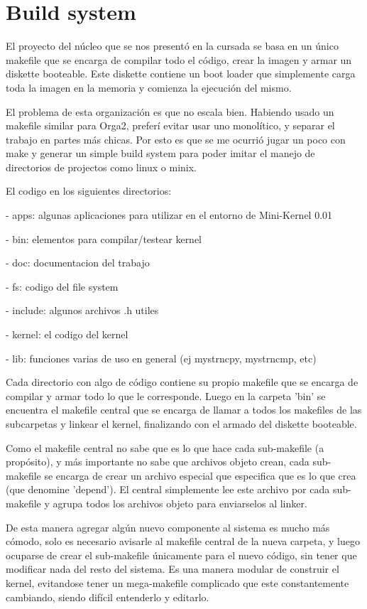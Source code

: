 \section{Build system}

El proyecto del núcleo que se nos presentó en la cursada se basa en un único
makefile que se encarga de compilar todo el código, crear la imagen y armar
un diskette booteable.
Este diskette contiene un boot loader que simplemente carga toda la imagen en
la memoria y comienza la ejecución del mismo.

El problema de esta organización es que no escala bien. Habiendo usado un
makefile similar para Orga2, preferí evitar usar uno monolítico, y
separar el trabajo en partes más chicas.
Por esto es que se me ocurrió jugar un poco con make y generar un simple build
system para poder imitar el manejo de directorios de projectos como linux o
minix.

El codigo en los siguientes directorios:

- apps: algunas aplicaciones para utilizar en el entorno de Mini-Kernel 0.01

- bin: elementos para compilar/testear kernel

- doc: documentacion del trabajo

- fs: codigo del file system

- include: algunos archivos .h utiles

- kernel: el codigo del kernel

- lib: funciones varias de uso en general (ej mystrncpy, mystrncmp, etc)

Cada directorio con algo de código contiene su propio makefile que se
encarga de compilar y armar todo lo que le corresponde. Luego en la carpeta
'bin' se encuentra el makefile central que se encarga de llamar a todos los
makefiles de las subcarpetas y linkear el kernel, finalizando con el armado del
diskette booteable.

Como el makefile central no sabe que es lo que hace cada sub-makefile (a
propósito), y más importante no sabe que archivos objeto crean, cada
sub-makefile se encarga de crear un archivo especial que especifica que es lo
que crea (que denomine 'depend'). El central simplemente lee este archivo por
cada sub-makefile y agrupa todos los archivos objeto para enviarselos al linker.

De esta manera agregar algún nuevo componente al sistema es mucho más cómodo,
solo es necesario avisarle al makefile central de la nueva carpeta, y luego
ocuparse de crear el sub-makefile únicamente para el nuevo código, sin tener que
modificar nada del resto del sistema. Es una manera modular de construir el
kernel, evitandose tener un mega-makefile complicado que este constantemente
cambiando, siendo difícil entenderlo y editarlo.


